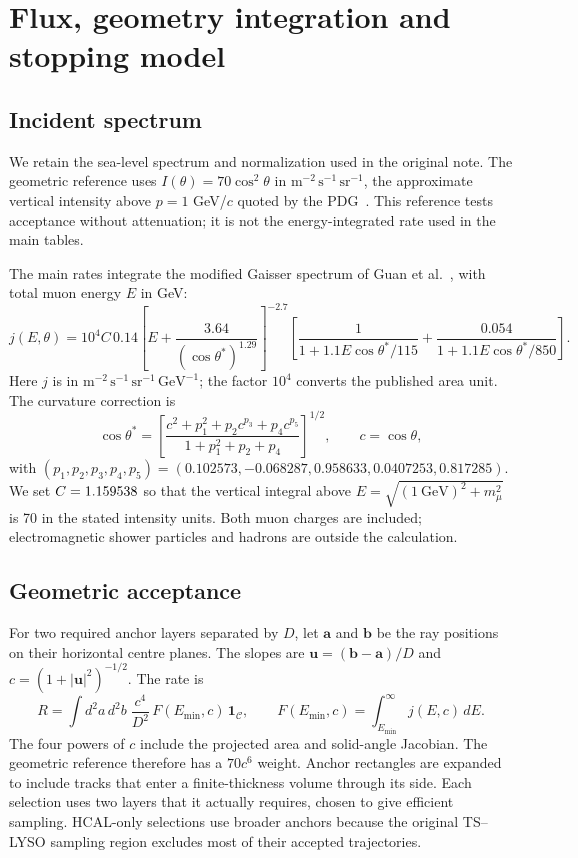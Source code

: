 \section{Flux, geometry integration and stopping model}
\label{sec:method}
\subsection{Incident spectrum}
We retain the sea-level spectrum and normalization used in the original note.
The geometric reference uses $I(\theta)=70\cos^2\theta$ in
$\mathrm{m^{-2}\,s^{-1}\,sr^{-1}}$, the approximate vertical intensity above
$p=1$ GeV/$c$ quoted by the PDG~\cite{pdg}. This reference tests acceptance
without attenuation; it is not the energy-integrated rate used in the main tables.

The main rates integrate the modified Gaisser spectrum of Guan et
al.~\cite{guan}, with total muon energy $E$ in GeV:
\begin{equation}
 j(E,\theta)=10^4 C\,0.14
 \left[E+\frac{3.64}{(\cos\theta^*)^{1.29}}\right]^{-2.7}
 \left[\frac{1}{1+1.1E\cos\theta^*/115}
       +\frac{0.054}{1+1.1E\cos\theta^*/850}\right].
 \label{eq:flux}
\end{equation}
Here $j$ is in $\mathrm{m^{-2}\,s^{-1}\,sr^{-1}\,GeV^{-1}}$; the factor $10^4$
converts the published area unit. The curvature correction is
\begin{equation}
 \cos\theta^*=\left[\frac{c^2+p_1^2+p_2c^{p_3}+p_4c^{p_5}}
 {1+p_1^2+p_2+p_4}\right]^{1/2},\qquad c=\cos\theta,
\end{equation}
with $(p_1,p_2,p_3,p_4,p_5)=(0.102573,-0.068287,0.958633,0.0407253,0.817285)$.
We set $C=1.159538{}$ so that the vertical integral above
$E=\sqrt{(1\ \mathrm{GeV})^2+m_\mu^2}$ is 70 in the stated intensity units.
Both muon charges are included; electromagnetic shower particles and hadrons
are outside the calculation.

\subsection{Geometric acceptance}
For two required anchor layers separated by $D$, let $\mathbf a$ and
$\mathbf b$ be the ray positions on their horizontal centre planes. The
slopes are $\mathbf u=(\mathbf b-\mathbf a)/D$ and
$c=(1+|\mathbf u|^2)^{-1/2}$. The rate is
\begin{equation}
 R=\int d^2a\,d^2b\;\frac{c^4}{D^2}\,
 F(E_{\min},c)\,\mathbf 1_{\mathcal C},\qquad
 F(E_{\min},c)=\int_{E_{\min}}^\infty j(E,c)\,dE.
 \label{eq:anchors}
\end{equation}
The four powers of $c$ include the projected area and solid-angle Jacobian.
The geometric reference therefore has a $70c^6$ weight. Anchor rectangles
are expanded to include tracks that enter a finite-thickness volume through
its side. Each selection uses two layers that it actually requires, chosen
to give efficient sampling. HCAL-only selections use broader anchors because the
original TS--LYSO sampling region excludes most of their accepted trajectories.

